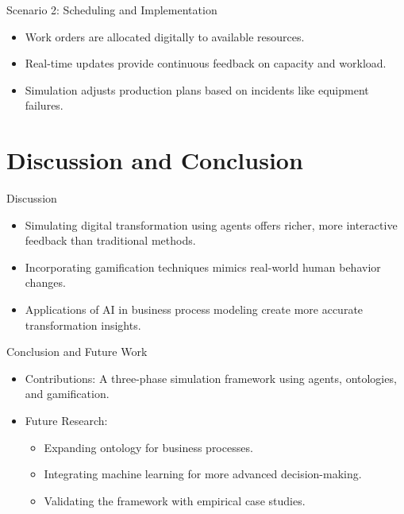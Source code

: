 \begin{frame}{Scenario 2: Scheduling and Implementation}
    \begin{itemize}
        \item Work orders are allocated digitally to available resources.
        \item Real-time updates provide continuous feedback on capacity and workload.
        \item Simulation adjusts production plans based on incidents like equipment failures.
    \end{itemize}
\end{frame}

\section{Discussion and Conclusion}

\begin{frame}{Discussion}
    \begin{itemize}
        \item Simulating digital transformation using agents offers richer, more interactive feedback than traditional methods.
        \item Incorporating gamification techniques mimics real-world human behavior changes.
        \item Applications of AI in business process modeling create more accurate transformation insights.
    \end{itemize}
\end{frame}

\begin{frame}{Conclusion and Future Work}
    \begin{itemize}
        \item Contributions: A three-phase simulation framework using agents, ontologies, and gamification.
        \item Future Research:
        \begin{itemize}
            \item Expanding ontology for business processes.
            \item Integrating machine learning for more advanced decision-making.
            \item Validating the framework with empirical case studies.
        \end{itemize}
    \end{itemize}
\end{frame}
